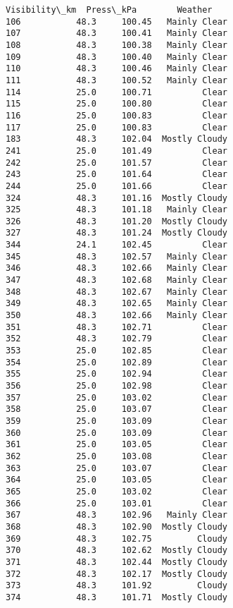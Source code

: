 \documentclass[11pt]{article}
\begin{document}
\begin{tcolorbox}[breakable, size=fbox, boxrule=.5pt, pad at break*=1mm, opacityfill=0]
\begin{Verbatim}[commandchars=\\\{\}]
     Visibility\_km  Press\_kPa        Weather
106           48.3     100.45   Mainly Clear
107           48.3     100.41   Mainly Clear
108           48.3     100.38   Mainly Clear
109           48.3     100.40   Mainly Clear
110           48.3     100.46   Mainly Clear
111           48.3     100.52   Mainly Clear
114           25.0     100.71          Clear
115           25.0     100.80          Clear
116           25.0     100.83          Clear
117           25.0     100.83          Clear
183           48.3     102.04  Mostly Cloudy
241           25.0     101.49          Clear
242           25.0     101.57          Clear
243           25.0     101.64          Clear
244           25.0     101.66          Clear
324           48.3     101.16  Mostly Cloudy
325           48.3     101.18   Mainly Clear
326           48.3     101.20  Mostly Cloudy
327           48.3     101.24  Mostly Cloudy
344           24.1     102.45          Clear
345           48.3     102.57   Mainly Clear
346           48.3     102.66   Mainly Clear
347           48.3     102.68   Mainly Clear
348           48.3     102.67   Mainly Clear
349           48.3     102.65   Mainly Clear
350           48.3     102.66   Mainly Clear
351           48.3     102.71          Clear
352           48.3     102.79          Clear
353           25.0     102.85          Clear
354           25.0     102.89          Clear
355           25.0     102.94          Clear
356           25.0     102.98          Clear
357           25.0     103.02          Clear
358           25.0     103.07          Clear
359           25.0     103.09          Clear
360           25.0     103.09          Clear
361           25.0     103.05          Clear
362           25.0     103.08          Clear
363           25.0     103.07          Clear
364           25.0     103.05          Clear
365           25.0     103.02          Clear
366           25.0     103.01          Clear
367           48.3     102.96   Mainly Clear
368           48.3     102.90  Mostly Cloudy
369           48.3     102.75         Cloudy
370           48.3     102.62  Mostly Cloudy
371           48.3     102.44  Mostly Cloudy
372           48.3     102.17  Mostly Cloudy
373           48.3     101.92         Cloudy
374           48.3     101.71  Mostly Cloudy
\end{Verbatim}
\end{tcolorbox}
        

    
    
    
\end{document}
